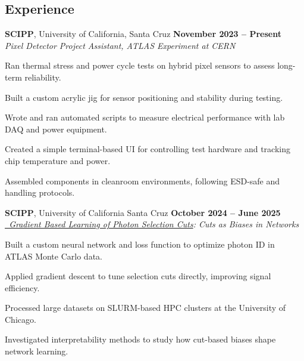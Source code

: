 \documentclass[margin,line]{resume}
\let\origsection\section%
\let\section\subsection%
\let\section\origsection%
\begin{document}
\begin{resume}
\section{\mysidestyle Experience}

\textbf{SCIPP}, University of California, Santa Cruz \hfill \textbf{November 2023 -- Present}\\
\textsl{Pixel Detector Project Assistant, ATLAS Experiment at CERN}
\begin{list2}
\item Ran thermal stress and power cycle tests on hybrid pixel sensors to assess long-term reliability.
\item Built a custom acrylic jig for sensor positioning and stability during testing.
\item Wrote and ran automated scripts to measure electrical performance with lab DAQ and power equipment.
\item Created a simple terminal-based UI for controlling test hardware and tracking chip temperature and power.
\item Assembled components in cleanroom environments, following ESD-safe and handling protocols.
\end{list2}


\textbf{SCIPP}, University of California Santa Cruz \hfill \textbf{October 2024 -- June 2025}\\
\textsl{\href{https://github.com/ScottieJPhillips/Gradient-Based-Learning-of-Photon-Selection-Cuts}{~Gradient Based Learning of Photon Selection Cuts}: Cuts as Biases in Networks}
\begin{list2}
\item Built a custom neural network and loss function to optimize photon ID in ATLAS Monte Carlo data.
\item Applied gradient descent to tune selection cuts directly, improving signal efficiency.
\item Processed large datasets on SLURM-based HPC clusters at the University of Chicago.
\item Investigated interpretability methods to study how cut-based biases shape network learning.
\end{list2}


\end{resume}
\end{document}
